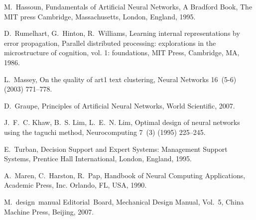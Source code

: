 \documentclass{elsart}
\begin{document}
\begin{thebibliography}{10}
M.~Hassoun, Fundamentals of Artificial Neural Networks, A Bradford Book, The
  MIT press Cambridge, Massachusetts, London, England, 1995.

D.~Rumelhart, G.~Hinton, R.~Williams, Learning internal representations by
  error propagation, Parallel distributed processing: explorations in the
  microstructure of cognition, vol. 1: foundations, MIT Press, Cambridge, MA,
  1986.

L.~Massey,
  {On the quality of art1 text clustering}, Neural
  Networks 16~(5-6) (2003) 771--778.


D.~Graupe, Principles of Artificial Neural Networks, World Scientific, 2007.

J.~F.~C. Khaw, B.~S. Lim, L.~E.~N. Lim,
 {Optimal design of neural networks using the taguchi
  method}, Neurocomputing 7~(3) (1995) 225--245.


E.~Turban, Decision Support and Expert Systems: Management Support Systems,
  Prentice Hall International, London, England, 1995.

A.~Maren, C.~Harston, R.~Pap, Handbook of Neural Computing Applications,
  Academic Press, Inc. Orlando, FL, USA, 1990.

M.~design~manual Editorial~Board, Mechanical Design Manual, Vol.~5, China
  Machine Press, Beijing, 2007.

\end{thebibliography}
\end{document}
